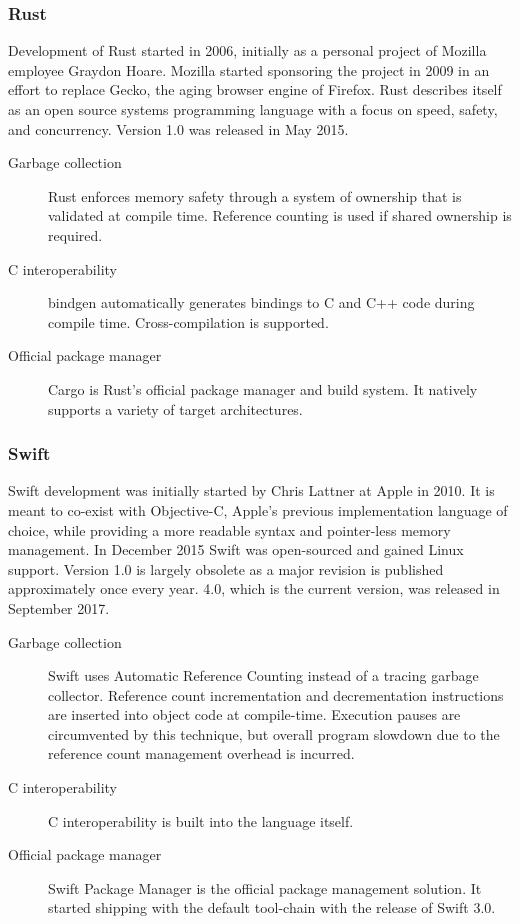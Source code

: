 \subsubsection{Rust}
Development of Rust started in 2006, initially as a personal project of Mozilla employee Graydon Hoare. Mozilla started sponsoring the project in 2009 in an effort to replace Gecko, the aging browser engine of Firefox. Rust describes itself as an open source systems programming language with a focus on speed, safety, and concurrency. 
Version 1.0 was released in May 2015.
\begin{description} 
\item [Garbage collection]
Rust enforces memory safety through a system of ownership that is validated at compile time. Reference counting is used if shared ownership is required.
\item [C interoperability] %
bindgen automatically generates bindings to C and C++ code during compile time. Cross-compilation is supported.
\item [Official package manager]
Cargo is Rust's official package manager and build system. It natively supports a variety of target architectures.
\end{description}

\subsubsection{Swift}
Swift development was initially started by Chris Lattner at Apple in 2010. It is meant to co-exist with Objective-C, Apple's previous implementation language of choice, while providing a more readable syntax and pointer-less memory management. In December 2015 Swift was open-sourced and gained Linux support. Version 1.0 is largely obsolete as a major revision is published approximately once every year. 
4.0, which is the current version, was released in September 2017. 
\begin{description} 
\item [Garbage collection]
Swift uses Automatic Reference Counting instead of a tracing garbage collector. Reference count incrementation and decrementation instructions are inserted into object code at compile-time. Execution pauses are circumvented by this technique, but overall program slowdown due to the reference count management overhead is incurred.
\item [C interoperability]
C interoperability is built into the language itself.
\item [Official package manager]
Swift Package Manager is the official package management solution. It started shipping with the default tool-chain with the release of Swift 3.0.
\end{description}

